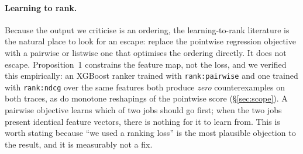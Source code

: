 \documentclass[11pt,twocolumn]{article}
\begin{document}
\paragraph{Learning to rank.}
Because the output we criticise is an ordering, the learning-to-rank literature
\cite{Burges2005, Liu2009} is the natural place to look for an escape: replace
the pointwise regression objective with a pairwise or listwise one that
optimises the ordering directly. It does not escape. Proposition~1 constrains
the feature map, not the loss, and we verified this empirically: an XGBoost
ranker trained with \texttt{rank:pairwise} and one trained with
\texttt{rank:ndcg} over the same features both produce \emph{zero}
counterexamples on both traces, as do monotone reshapings of the pointwise score
(\S\ref{sec:scope}). A pairwise objective learns which of two jobs should go
first; when the two jobs present identical feature vectors, there is nothing for
it to learn from. This is worth stating because ``we used a ranking loss'' is the
most plausible objection to the result, and it is measurably not a fix.
\end{document}
